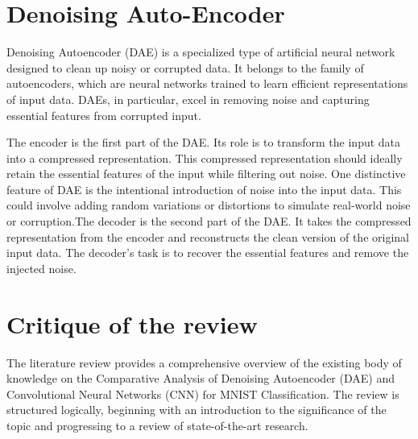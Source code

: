 \section{Denoising Auto-Encoder}
Denoising Autoencoder (DAE) is a specialized type of artificial neural network designed to clean up noisy or corrupted data. It belongs to the family of autoencoders, which are neural networks trained to learn efficient representations of input data. DAEs, in particular, excel in removing noise and capturing essential features from corrupted input.

The encoder is the first part of the DAE. Its role is to transform the input data into a compressed representation. This compressed representation should ideally retain the essential features of the input while filtering out noise.
One distinctive feature of DAE is the intentional introduction of noise into the input data. This could involve adding random variations or distortions to simulate real-world noise or corruption.The decoder is the second part of the DAE. It takes the compressed representation from the encoder and reconstructs the clean version of the original input data. The decoder's task is to recover the essential features and remove the injected noise.

\section{Critique of the review} %
The literature review provides a comprehensive overview of the existing body of knowledge on the Comparative Analysis of Denoising Autoencoder (DAE) and Convolutional Neural Networks (CNN) for MNIST Classification. The review is structured logically, beginning with an introduction to the significance of the topic and progressing to a review of state-of-the-art research.

